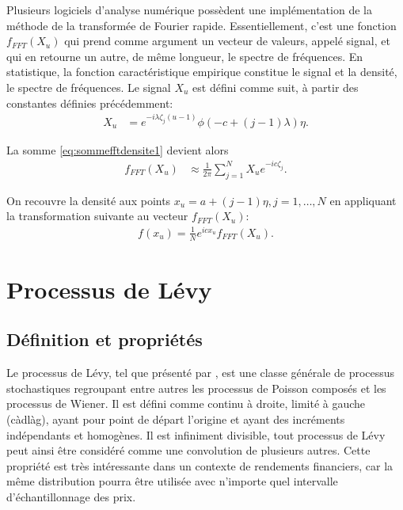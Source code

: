 Plusieurs logiciels d'analyse numérique possèdent une implémentation
de la méthode de la transformée de Fourier rapide. Essentiellement,
c'est une fonction $f_{FFT}(X_u)$ qui prend comme argument un vecteur
de valeurs, appelé signal, et qui en retourne un autre, de même
longueur, le spectre de fréquences. En statistique, la fonction
caractéristique empirique constitue le signal et la densité, le
spectre de fréquences. Le signal $X_u$ est défini comme suit, à partir
des constantes définies précédemment:
\begin{align}
  \label{eq:signalfftfonction}
  X_u &= e^{-i\lambda\zeta_j(u-1)} \phi\left(-c+(j-1)\lambda\right)
  \eta.
\end{align}

La somme \eqref{eq:sommefftdensite1} devient alors
\begin{align}
  \label{eq:fftfonction}
  f_{FFT}(X_u) &\approx \frac{1}{2\pi} \sum_{j=1}^N X_u e^{-ic\zeta_j}.
\end{align}

On recouvre la densité aux points $x_u=a+(j-1)\eta, j=1,\ldots,N$ en
appliquant la transformation suivante au vecteur $f_{FFT}(X_u)$:
\begin{align}
  \label{eq:densitefftfonction}
  f(x_u) = \frac{1}{N} e^{icx_u} f_{FFT}(X_u).
\end{align}

\section{Processus de Lévy}
\label{sec:processuslevy}

\subsection{Définition et propriétés}
\label{sec:defproplevy}

Le processus de Lévy, tel que présenté par \cite{barndorff2001levy},
est une classe générale de processus stochastiques regroupant entre
autres les processus de Poisson composés et les processus de Wiener.
Il est défini comme continu à droite, limité à gauche (càdlàg), ayant
pour point de départ l'origine et ayant des incréments indépendants et
homogènes. Il est infiniment divisible, tout processus de Lévy peut
ainsi être considéré comme une convolution de plusieurs autres. Cette
propriété est très intéressante dans un contexte de rendements
financiers, car la même distribution pourra être utilisée avec
n'importe quel intervalle d'échantillonnage des prix.

